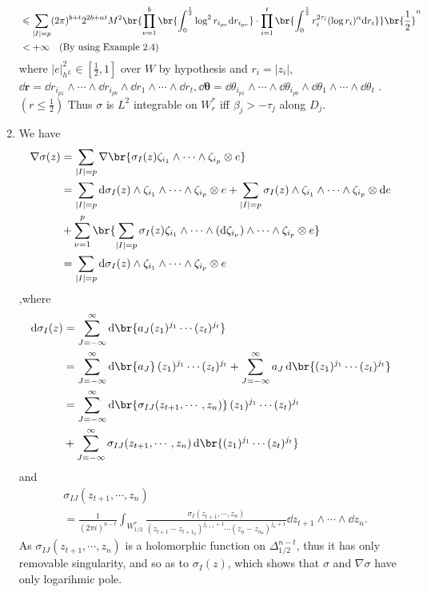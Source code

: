 \documentclass[lang=en,12pt]{beautybook}
\begin{document}
\begin{solution}
\begin{enumerate}
{\begin{align*}
            &\leqslant \sum_{|I|=p}(2\pi)^{b+t} 2^{2b+\alpha t} M^2  \br{\prod_{\nu=1}^b\br{ \int_{0}^{\frac 12} \log^2 r_{i_{p\nu}} \dd r_{i_{p\nu}} }\cdot \prod_{i=1}^t\br{ \int_{0}^{\frac 12} r_i^{2\tau_i}(\log r_i)^{\alpha} \dd r_i } } \br{\frac 12}^n\\ 
            &<+\infty \text{\quad (By using Example 2.4)}
        \end{align*}}
            where $|e|^2_{h^L}\in [\frac 12,1]$ over $W$ by hypothesis and $r_i=|z_i|$, $\dd\bm{r}=\dd r_{i_{p1}}\wedge \cdots \wedge\dd r_{i_{pb}}\wedge \dd r_{1}\wedge \cdots \wedge \dd r_{t}, \dd\bm{\theta}=\dd \theta_{i_{p1}}\wedge \cdots \wedge\dd \theta_{i_{pb}}\wedge \dd \theta_{1}\wedge \cdots \wedge \dd \theta_{t}$ . $(r\leq \frac 12)$ Thus $\sigma$ is $L^2$ integrable on $W_r^*$ iff $\beta_j>-\tau_j$ along $D_j$.

        \item We have {\small\begin{align*}
            \nabla \sigma(z) &=\sum_{\abs{I}=p} \nabla \br{\sigma_I(z) \zeta_{i_1}\wedge\cdots\wedge\zeta_{i_p}\otimes e}\\ 
            &=\sum_{\abs{I}=p} \dd\sigma_I(z) \wedge\zeta_{i_1}\wedge\cdots\wedge\zeta_{i_p}\otimes e+\sum_{\abs{I}=p} \sigma_I(z) \wedge\zeta_{i_1}\wedge\cdots\wedge\zeta_{i_p}\otimes \dd e\\
            &+ \sum_{\nu=1}^p \br{\sum_{\abs{I}=p} \sigma_I(z) \zeta_{i_1}\wedge\cdots\wedge(\dd\zeta_{i_\nu})\wedge\cdots\wedge\zeta_{i_p}\otimes e}\\ 
            &=\sum_{\abs{I}=p} \dd\sigma_I(z) \wedge\zeta_{i_1}\wedge\cdots\wedge\zeta_{i_p}\otimes e
        \end{align*}}
            ,where \begin{align*}
                \dd\sigma_I(z) &=\sum_{J=-\infty}^{\infty} \dd \br{ a_J (z_1)^{j_1} \cdots (z_t)^{j_t}}\\ 
                &=\sum_{J=-\infty}^{\infty} \dd \br{a_J } (z_1)^{j_1} \cdots (z_t)^{j_t}+\sum_{J=-\infty}^{\infty} a_J \dd \br{(z_1)^{j_1} \cdots (z_t)^{j_t}}\\ 
                &=\sum_{J=-\infty}^{\infty} \dd \br{\sigma_{IJ}(z_{t+1},\cdots,z_n)} (z_1)^{j_1} \cdots (z_t)^{j_t}\\
                &+\sum_{J=-\infty}^{\infty} \sigma_{IJ}(z_{t+1},\cdots,z_n) \dd \br{(z_1)^{j_1} \cdots (z_t)^{j_t}}
            \end{align*}
            and 
            \begin{align*}
                &\sigma_{IJ}(z_{t+1},\cdots,z_n) \\
                &=\frac{1}{(2\pi i)^{n-t}} \int_{W_{1/2}^*}\frac{\sigma_I(z_{t+1},\cdots,z_n)}{(z_{t+1}-z_{{t+1}_0})^{j_{t+1}+1} \cdots (z_n-z_{n_0})^{j_n+1}}\dd z_{t+1}\wedge\cdots\wedge\dd z_n.
            \end{align*}
                As $\sigma_{IJ}(z_{t+1},\cdots,z_n)$ is a holomorphic function on $\Delta_{1/2}^{n-t}$, thus it has only removable singularity, and so as to $\sigma_I(z)$, which shows that $\sigma$ and $\nabla\sigma$ have only logarihmic pole.
                


\end{enumerate}
\end{solution}
\end{document}
